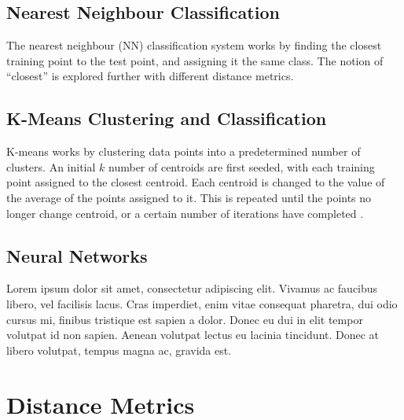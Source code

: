 \documentclass[a4paper, 10pt, conference]{ieeeconf}
\begin{document}
\subsection{Nearest Neighbour Classification}
The nearest neighbour (NN) classification system works by finding the closest training point to the test point, and assigning it the same class. The notion of ``closest'' is explored further with different distance metrics.
\subsection{K-Means Clustering and Classification}
K-means works by clustering data points into a predetermined number of clusters. An initial $k$ number of centroids are first seeded, with each training point assigned to the closest centroid. Each centroid is changed to the value of the average of the points assigned to it. This is repeated until the points no longer change centroid, or a certain number of iterations have completed \cite{kmeans}.
\subsection{Neural Networks}
Lorem ipsum dolor sit amet, consectetur adipiscing elit. Vivamus ac faucibus libero, vel facilisis lacus. Cras imperdiet, enim vitae consequat pharetra, dui odio cursus mi, finibus tristique est sapien a dolor. Donec eu dui in elit tempor volutpat id non sapien. Aenean volutpat lectus eu lacinia tincidunt. Donec at libero volutpat, tempus magna ac, gravida est.

\section{Distance Metrics}
\end{document}
